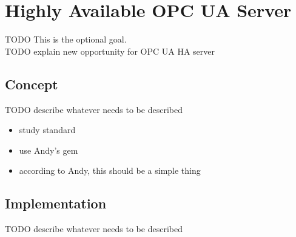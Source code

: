 \chapter{Highly Available OPC UA Server}\label{ch:opc-ua-server}
TODO This is the optional goal.\\
TODO explain new opportunity for OPC UA HA server

\section{Concept}
TODO describe whatever needs to be described

\begin{itemize}
	\item study standard
	\item use Andy's gem
	\item according to Andy, this should be a simple thing
\end{itemize}

\section{Implementation}
TODO describe whatever needs to be described
